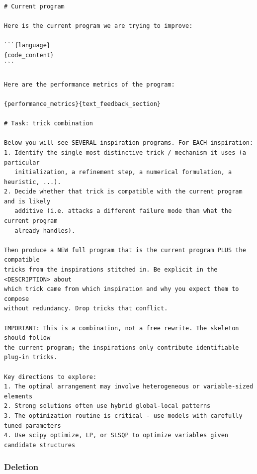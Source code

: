 \begin{ttcolorbox}
\begin{lstlisting}[style=prompt]
# Current program

Here is the current program we are trying to improve:

```{language}
{code_content}
```

Here are the performance metrics of the program:

{performance_metrics}{text_feedback_section}

# Task: trick combination

Below you will see SEVERAL inspiration programs. For EACH inspiration:
1. Identify the single most distinctive trick / mechanism it uses (a particular
   initialization, a refinement step, a numerical formulation, a heuristic, ...).
2. Decide whether that trick is compatible with the current program and is likely
   additive (i.e. attacks a different failure mode than what the current program
   already handles).

Then produce a NEW full program that is the current program PLUS the compatible
tricks from the inspirations stitched in. Be explicit in the <DESCRIPTION> about
which trick came from which inspiration and why you expect them to compose
without redundancy. Drop tricks that conflict.

IMPORTANT: This is a combination, not a free rewrite. The skeleton should follow
the current program; the inspirations only contribute identifiable plug-in tricks.

Key directions to explore:
1. The optimal arrangement may involve heterogeneous or variable-sized elements
2. Strong solutions often use hybrid global-local patterns
3. The optimization routine is critical - use models with carefully tuned parameters
4. Use scipy optimize, LP, or SLSQP to optimize variables given candidate structures
\end{lstlisting}
\end{ttcolorbox}


\subsubsection{Deletion}
\label{app:prompts:del}

